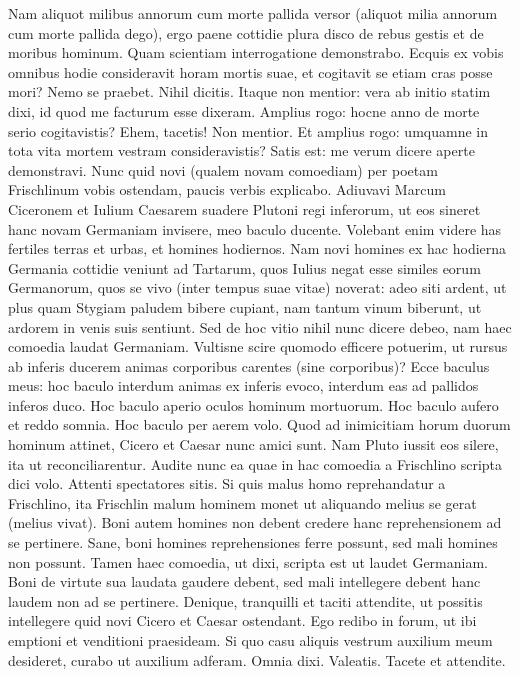 \documentclass[20pt, twoside]{extarticle}
\newcommand{\alt}[1]{(#1)}
\begin{document}
\begin{pages}
\begin{Rightside}
	\pend
	\pstart
		Nam aliquot milibus annorum cum morte pallida versor \alt{aliquot milia annorum cum morte pallida dego}, ergo paene cottidie plura disco de rebus gestis et de moribus hominum. Quam scientiam interrogatione demonstrabo. Ecquis ex vobis omnibus hodie consideravit horam mortis suae, et cogitavit se etiam cras posse mori? Nemo se praebet. Nihil dicitis. Itaque non mentior: vera ab initio statim dixi, id quod me facturum esse dixeram. Amplius rogo: hocne anno de morte serio cogitavistis? Ehem, tacetis! Non mentior. Et amplius rogo: umquamne in tota vita mortem vestram consideravistis? Satis est: me verum dicere aperte demonstravi.
	\pend
	\pstart
		Nunc quid novi \alt{qualem novam comoediam} per poetam Frischlinum vobis ostendam, paucis verbis explicabo. Adiuvavi Marcum Ciceronem et Iulium Caesarem suadere Plutoni regi inferorum, ut eos sineret hanc novam Germaniam invisere, meo baculo ducente. Volebant enim videre has fertiles terras et urbas, et homines hodiernos. Nam novi homines ex hac hodierna Germania cottidie veniunt ad Tartarum, quos Iulius negat esse similes eorum Germanorum, quos se vivo \alt{inter tempus suae vitae} noverat: adeo siti ardent, ut plus quam Stygiam paludem bibere cupiant, nam tantum vinum biberunt, ut ardorem in venis suis sentiunt. Sed de hoc vitio nihil nunc dicere debeo, nam haec comoedia laudat Germaniam.
	\pend
	\pstart
		Vultisne scire quomodo efficere potuerim, ut rursus ab inferis ducerem animas corporibus carentes \alt{sine corporibus}? Ecce baculus meus: hoc baculo interdum animas ex inferis evoco, interdum eas ad pallidos inferos duco. Hoc baculo aperio oculos hominum mortuorum. Hoc baculo aufero et reddo somnia. Hoc baculo per aerem volo. Quod ad inimicitiam horum duorum hominum attinet, Cicero et Caesar nunc amici sunt. Nam Pluto iussit eos silere, ita ut reconciliarentur.
	\pend
	\pstart
		Audite nunc ea quae in hac comoedia a Frischlino scripta dici volo. Attenti spectatores sitis. Si quis malus homo reprehandatur a Frischlino, ita Frischlin malum hominem monet ut aliquando melius se gerat \alt{melius vivat}. Boni autem homines non debent credere hanc reprehensionem ad se pertinere. Sane, boni homines reprehensiones ferre possunt, sed mali homines non possunt. Tamen haec comoedia, ut dixi, scripta est ut laudet Germaniam. Boni de virtute sua laudata gaudere debent, sed mali intellegere debent hanc laudem non ad se pertinere. Denique, tranquilli et taciti attendite, ut possitis intellegere quid novi Cicero et Caesar ostendant. Ego redibo in forum, ut ibi emptioni et venditioni praesideam. Si quo casu aliquis vestrum auxilium meum desideret, curabo ut auxilium adferam. Omnia dixi. Valeatis. Tacete et attendite.

\end{Rightside}
\end{pages}
\end{document}
